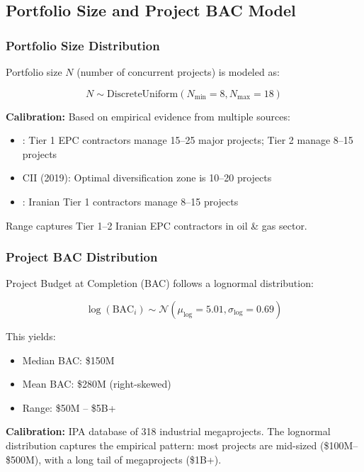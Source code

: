 \subsection{Portfolio Size and Project BAC Model}

\subsubsection{Portfolio Size Distribution}

Portfolio size $N$ (number of concurrent projects) is modeled as:

\begin{equation}
N \sim \text{DiscreteUniform}(N_{\min} = 8, N_{\max} = 18)
\end{equation}

\textbf{Calibration:} Based on empirical evidence from multiple sources:
\begin{itemize}
    \item \citet{merrow2011industrial}: Tier 1 EPC contractors manage 15--25 major projects; Tier 2 manage 8--15 projects
    \item CII (2019): Optimal diversification zone is 10--20 projects
    \item \citet{khanzadi2018integrating}: Iranian Tier 1 contractors manage 8--15 projects
\end{itemize}

Range captures Tier 1--2 Iranian EPC contractors in oil \& gas sector.

\subsubsection{Project BAC Distribution}

Project Budget at Completion (BAC) follows a lognormal distribution:

\begin{equation}
\log(\text{BAC}_i) \sim \mathcal{N}(\mu_{\log} = 5.01, \sigma_{\log} = 0.69)
\end{equation}

This yields:
\begin{itemize}
    \item Median BAC: \$150M
    \item Mean BAC: \$280M (right-skewed)
    \item Range: \$50M -- \$5B+
\end{itemize}

\textbf{Calibration:} \citet{merrow2011industrial} IPA database of 318 industrial megaprojects. The lognormal distribution captures the empirical pattern: most projects are mid-sized (\$100M--\$500M), with a long tail of megaprojects (\$1B+).

